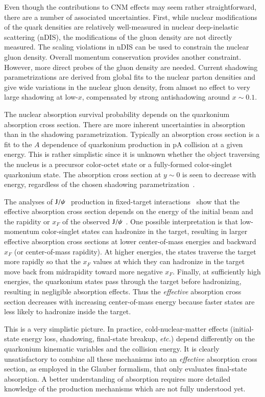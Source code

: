 Even though the contributions to CNM effects may 
seem rather straightforward, there are a number of associated uncertainties. 
First, while nuclear modifications of the quark densities are relatively 
well-measured in nuclear deep-inelastic scattering (nDIS), the modifications of the 
gluon density are not directly measured.  The scaling violations in nDIS can 
be used to constrain the nuclear gluon density. Overall momentum conservation 
provides another constraint. However, more direct probes of the gluon 
density are needed. Current shadowing parametrizations are derived from 
global fits to the nuclear parton densities and
give wide variations in the nuclear gluon 
density, from almost no effect to very large shadowing at low-$x$, 
compensated by strong antishadowing around $x \sim 0.1$.  


The nuclear absorption survival probability depends on the quarkonium 
absorption cross section. There are more inherent uncertainties 
in absorption than in the shadowing parametrization.
Typically an absorption cross section is a fit to the $A$ dependence 
of quarkonium production in pA collision at a given energy. 
This is rather simplistic since it is unknown whether the object traversing the
nucleus is a precursor 
color-octet state or a fully-formed color-singlet quarkonium state. The \jpsi absorption cross 
section at $y \sim 0$ is seen to decrease with energy, regardless of the chosen shadowing 
parametrization~\cite{Lourenco:2008sk}. 

The analyses of $\mathrm{J}/\psi\hspace {0.05in}$ production in fixed-target interactions~\cite{Lourenco:2008sk} 
show that the effective absorption
cross section depends on the energy of the initial beam and the rapidity or
$x_F$ of the observed $\mathrm{J}/\psi\hspace {0.05in}$.  One possible interpretation is that 
low-momentum color-singlet states can hadronize in the
target, resulting in larger effective absorption cross sections at lower
center-of-mass energies and backward $x_F$ (or center-of-mass rapidity).
At higher energies, the states traverse the target more rapidly so that
the $x_F$ values at which they can hadronize in the target move 
back from midrapidity toward more negative $x_F$.
Finally, at sufficiently high energies, the quarkonium states pass 
through the target before hadronizing, resulting in negligible absorption
effects.  Thus the {\it effective} absorption cross section decreases with 
increasing center-of-mass energy because faster states are less likely 
to hadronize inside the target.

This is a very simplistic picture. In practice, cold-nuclear-matter effects 
(initial-state energy loss, shadowing, final-state breakup, {\it etc.}) 
depend differently on the quarkonium kinematic variables and the collision energy. 
It is clearly unsatisfactory to combine all these mechanisms into an {\it effective} 
absorption cross section, as employed in the Glauber formalism, 
that only evaluates final-state absorption. 
A better understanding of absorption requires more detailed knowledge of the 
production mechanisms which are not fully understood yet.


